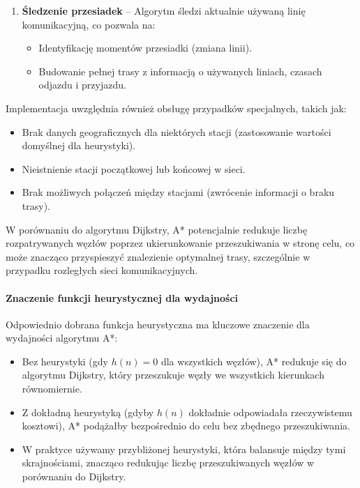 \documentclass[12pt,a4paper]{article}
\begin{document}
\begin{enumerate}
    \item \textbf{Śledzenie przesiadek} -- Algorytm śledzi aktualnie używaną linię komunikacyjną, co pozwala na:
    \begin{itemize}
        \item Identyfikację momentów przesiadki (zmiana linii).
        \item Budowanie pełnej trasy z informacją o używanych liniach, czasach odjazdu i przyjazdu.
    \end{itemize}
\end{enumerate}

Implementacja uwzględnia również obsługę przypadków specjalnych, takich jak:
\begin{itemize}
    \item Brak danych geograficznych dla niektórych stacji (zastosowanie wartości domyślnej dla heurystyki).
    \item Nieistnienie stacji początkowej lub końcowej w sieci.
    \item Brak możliwych połączeń między stacjami (zwrócenie informacji o braku trasy).
\end{itemize}

W porównaniu do algorytmu Dijkstry, A* potencjalnie redukuje liczbę rozpatrywanych węzłów poprzez ukierunkowanie przeszukiwania w stronę celu, co może znacząco przyspieszyć znalezienie optymalnej trasy, szczególnie w przypadku rozległych sieci komunikacyjnych.

\paragraph{Znaczenie funkcji heurystycznej dla wydajności}
Odpowiednio dobrana funkcja heurystyczna ma kluczowe znaczenie dla wydajności algorytmu A*:

\begin{itemize}
    \item Bez heurystyki (gdy $h(n) = 0$ dla wszystkich węzłów), A* redukuje się do algorytmu Dijkstry, który przeszukuje węzły we wszystkich kierunkach równomiernie.
    \item Z dokładną heurystyką (gdyby $h(n)$ dokładnie odpowiadała rzeczywistemu kosztowi), A* podążałby bezpośrednio do celu bez zbędnego przeszukiwania.
    \item W praktyce używamy przybliżonej heurystyki, która balansuje między tymi skrajnościami, znacząco redukując liczbę przeszukiwanych węzłów w porównaniu do Dijkstry.
\end{itemize}
\end{document}
